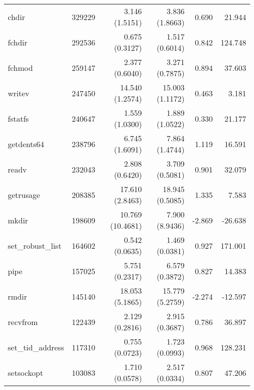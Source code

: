 \begin{longtable}{>{\ttfamily}lrrrrr}
                          chdir &     329229 &              3.146 (1.5151) &            3.836 (1.8663) &           0.690 &       21.944 \\
                         fchdir &     292536 &              0.675 (0.3127) &            1.517 (0.6014) &           0.842 &      124.748 \\
                         fchmod &     259147 &              2.377 (0.6040) &            3.271 (0.7875) &           0.894 &       37.603 \\
                         writev &     247450 &             14.540 (1.2574) &           15.003 (1.1172) &           0.463 &        3.181 \\
                        fstatfs &     240647 &              1.559 (1.0300) &            1.889 (1.0522) &           0.330 &       21.177 \\
                     getdents64 &     238796 &              6.745 (1.6091) &            7.864 (1.4744) &           1.119 &       16.591 \\
                          readv &     232043 &              2.808 (0.6420) &            3.709 (0.5081) &           0.901 &       32.079 \\
                      getrusage &     208385 &             17.610 (2.8463) &           18.945 (0.5085) &           1.335 &        7.583 \\
                          mkdir &     198609 &            10.769 (10.4681) &            7.900 (8.9436) &          -2.869 &      -26.638 \\
              set\_robust\_list &     164602 &              0.542 (0.0635) &            1.469 (0.0381) &           0.927 &      171.001 \\
                           pipe &     157025 &              5.751 (0.2317) &            6.579 (0.3872) &           0.827 &       14.383 \\
                          rmdir &     145140 &             18.053 (5.1865) &           15.779 (5.2759) &          -2.274 &      -12.597 \\
                       recvfrom &     122439 &              2.129 (0.2816) &            2.915 (0.3687) &           0.786 &       36.897 \\
              set\_tid\_address &     117310 &              0.755 (0.0723) &            1.723 (0.0993) &           0.968 &      128.231 \\
                     setsockopt &     103083 &              1.710 (0.0578) &            2.517 (0.0334) &           0.807 &       47.206 \\

\end{longtable}
